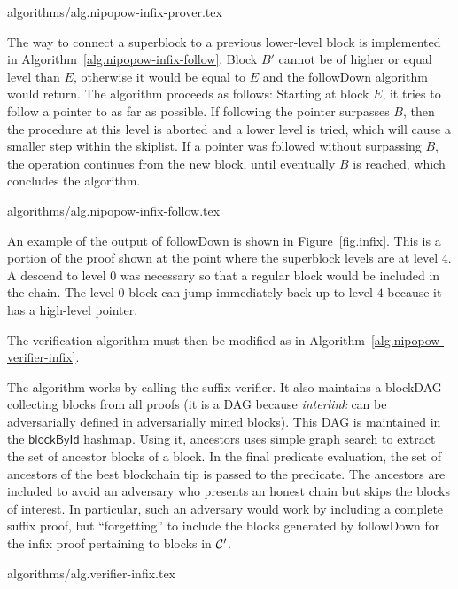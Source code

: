 {algorithms/alg.nipopow-infix-prover.tex}

The way to connect a superblock to a previous lower-level block is implemented
in Algorithm~\ref{alg.nipopow-infix-follow}.  Block $B'$ cannot be of higher or
equal level than $E$, otherwise it would be equal to $E$ and the
\textsf{followDown} algorithm would return. The algorithm proceeds as follows:
Starting at block $E$, it tries to follow a pointer to as far as possible. If
following the pointer surpasses $B$, then the procedure at this level is aborted
and a lower level is tried, which will cause a smaller step within the skiplist.
If a pointer was followed without surpassing $B$, the operation continues from
the new block, until eventually $B$ is reached, which concludes the algorithm.

{algorithms/alg.nipopow-infix-follow.tex}

An example of the output of \textsf{followDown} is shown in
Figure~\ref{fig.infix}. This is a portion of the proof shown at the point where
the superblock levels are at level $4$. A descend to level $0$ was necessary so
that a regular block would be included in the chain. The level $0$ block can
jump immediately back up to level $4$ because it has a high-level pointer.

The verification algorithm must then be modified as in
Algorithm~\ref{alg.nipopow-verifier-infix}.

The algorithm works by calling the suffix verifier. It also maintains a blockDAG
collecting blocks from all proofs (it is a DAG because \textit{interlink} can be
adversarially defined in adversarially mined blocks). This DAG is maintained in
the $\textsf{blockById}$ hashmap. Using it, \textsf{ancestors} uses simple graph
search to extract the set of ancestor blocks of a block. In the final predicate
evaluation, the set of ancestors of the best blockchain tip is passed to the
predicate. The ancestors are included to avoid an adversary who presents an
honest chain but skips the blocks of interest. In particular, such an adversary
would work by including a complete suffix proof, but ``forgetting'' to include
the blocks generated by \textsf{followDown} for the infix proof pertaining to
blocks in $\mathcal{C}'$.

{algorithms/alg.verifier-infix.tex}
